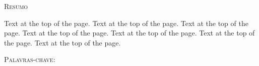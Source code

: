 \clearpage
\thispagestyle{empty}
\begin{center}
\textsc{\LARGE Resumo}\\[1.5cm]
\end{center}
Text at the top of the page. Text at the top of the page. 
Text at the top of the page. Text at the top of the page. 
Text at the top of the page. Text at the top of the page. 
Text at the top of the page.
 
\vspace{5mm} %

\blindtext 

\vspace{5mm} %

\textsc{Palavras-chave:}